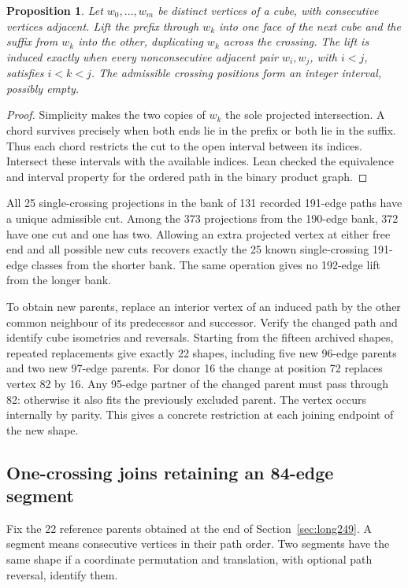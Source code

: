 \documentclass[11pt,a4paper]{article}
\newtheorem{proposition}[theorem]{Proposition}
\theoremstyle{definition}
\theoremstyle{remark}
\begin{document}
\begin{proposition}
Let \(w_0,\ldots,w_m\) be distinct vertices of a cube, with consecutive
vertices adjacent. Lift the prefix through \(w_k\) into one face of the
next cube and the suffix from \(w_k\) into the other, duplicating
\(w_k\) across the crossing. The lift is induced exactly when every
nonconsecutive adjacent pair \(w_i,w_j\), with \(i<j\), satisfies
\(i<k<j\). The admissible crossing positions form an integer interval,
possibly empty.
\end{proposition}
\begin{proof}
Simplicity makes the two copies of \(w_k\) the sole projected
intersection. A chord survives precisely when both ends lie in the
prefix or both lie in the suffix. Thus each chord restricts the cut
to the open interval between its indices. Intersect these intervals
with the available indices. Lean checked the equivalence and interval
property for the ordered path in the binary product graph.
\end{proof}

All 25 single-crossing projections in the bank of 131 recorded
191-edge paths have a unique admissible cut. Among the 373 projections
from the 190-edge bank, 372 have one cut and one has two. Allowing an
extra projected vertex at either free end and all possible new cuts
recovers exactly the 25 known single-crossing 191-edge classes from
the shorter bank. The same operation gives no 192-edge lift from the
longer bank.

To obtain new parents, replace an interior vertex of an induced path
by the other common neighbour of its predecessor and successor.
Verify the changed path and identify cube isometries and reversals.
Starting from the fifteen archived shapes, repeated replacements
give exactly 22 shapes, including five new 96-edge parents and two
new 97-edge parents. For donor 16 the change at position 72 replaces
vertex 82 by 16. Any 95-edge partner of the changed parent must pass
through 82: otherwise it also fits the previously excluded parent.
The vertex occurs internally by parity. This gives a concrete
restriction at each joining endpoint of the new shape.

\subsection{One-crossing joins retaining an 84-edge segment}\label{sec:corner250}

Fix the 22 reference parents obtained at the end of
Section~\ref{sec:long249}. A segment means consecutive vertices in
their path order. Two segments have the same shape if a coordinate
permutation and translation, with optional path reversal, identify them.
\end{document}
